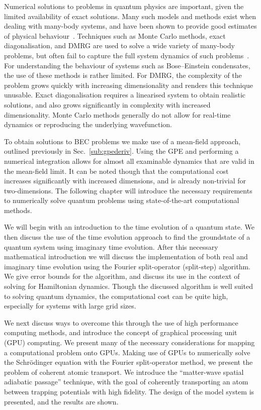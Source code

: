 Numerical solutions to problems in quantum physics are important, given the limited availability of exact solutions. Many such models and methods exist when dealing with many-body systems, and have been shown to provide good estimates of physical behaviour~\cite{BK:Krauth_2006}. Techniques such as Monte Carlo methods, exact diagonalisation, and DMRG are used to solve a wide variety of many-body problems, but often fail to capture the full system dynamics of such problems~\cite{NUM:Schollwock_rmp_2005}. For understanding the behaviour of systems such as Bose--Einstein condensates, the use of these methods is rather limited. For DMRG, the complexity of the problem grows quickly with increasing dimensionality and renders this technique unusable. Exact diagonalisation requires a linearised system to obtain realistic solutions, and also grows significantly in complexity with increased dimensionality. Monte Carlo methods generally do not allow for real-time dynamics or reproducing the underlying wavefunction.

To obtain solutions to BEC problems we make use of a mean-field approach, outlined previously in Sec.~\ref{sub:gpederiv}. Using the GPE and performing a numerical integration allows for almost all examinable dynamics that are valid in the mean-field limit. It can be noted though that the computational cost increases significantly with increased dimensions, and is already non-trivial for two-dimensions. The following chapter will introduce the necessary requirements to numerically solve quantum problems using state-of-the-art computational methods.

We will begin with an introduction to the time evolution of a quantum state. We then discuss the use of the time evolution approach to find the groundstate of a quantum system using imaginary time evolution. After this necessary mathematical introduction we will discuss the implementation of both real and imaginary time evolution using the Fourier split-operator (split-step) algorithm. We give error bounds for the algorithm, and discuss its use in the context of solving for Hamiltonian dynamics. Though the discussed algorithm is well suited to solving quantum dynamics, the computational cost can be quite high, especially for systems with large grid sizes.

We next discuss ways to overcome this through the use of high performance computing methods, and introduce the concept of graphical processing unit (GPU) computing. We present many of the necessary considerations for mapping a computational problem onto GPUs. Making use of GPUs to numerically solve the Schr\"odinger equation with the Fourier split-operator method, we present the problem of coherent atomic transport. We introduce the ``matter-wave spatial adiabatic passage'' technique, with the goal of coherently transporting an atom between trapping potentials with high fidelity. The design of the model system is presented, and the results are shown.

